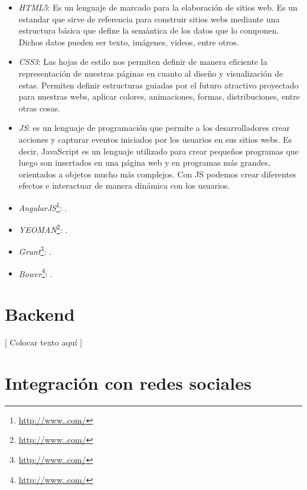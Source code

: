\documentclass[oneside]{book}
\begin{document}
	\begin{itemize}
	\renewcommand{\labelitemi}{\scriptsize\tiny$\blacksquare$} 
	\itemsep=7pt \topsep=0pt \partopsep=0pt \parskip=0pt \parsep=0pt

		\item \textit{HTML5}: Es un lenguaje de marcado para la elaboración de sitios web. Es un estandar que sirve de referencia para construir sitios webs mediante una estructura básica que define la semántica de los datos que lo componen. Dichos datos pueden ser texto, imágenes, videos, entre otros.
		
		\item \textit{CSS3}: Las hojas de estilo nos permiten definir de manera eficiente la representación de nuestras páginas en cuanto al diseño y visualización de estas. Permiten definir estructuras guiadas por el futuro atractivo proyectado para nuestras webs, aplicar colores, animaciones, formas, distribuciones, entre otras cosas.

		\item \textit{JS}: es un lenguaje de programación que permite a los desarrolladores crear acciones y capturar eventos iniciados por los usuarios en sus sitios webs. Es decir, JavaScript es un lenguaje utilizado para crear pequeños programas que luego son insertados en una página web y en programas más grandes, orientados a objetos mucho más complejos. Con JS podemos crear diferentes efectos e interactuar de manera dinámica con los usuarios.
		
		\item \textit{AngularJS}\footnote{\url{http://www..com/}}: .
		
		\item \textit{YEOMAN}\footnote{\url{http://www..com/}}: .

		\item \textit{Grunt}\footnote{\url{http://www..com/}}: .

		\item \textit{Bower}\footnote{\url{http://www..com/}}: .

	\end{itemize}
\bigskip


\section{Backend}

	[ Colocar texto aquí ]
\bigskip



\section{Integración con redes sociales}
\end{document}

